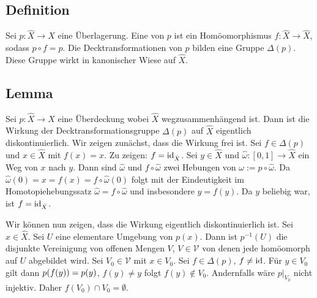 \subsection[Definition: Decktransformation]{Definition} %
\label{sub:12.6}
Sei $p : \hat{X} \to X$ eine Überlagerung. Eine  von $p$ ist ein Homöomorphismus $f : \hat{X} \to \hat{X}$, sodass $p \circ f = p$. Die 
Decktransformationen von $p$ bilden eine Gruppe $\Delta(p)$. Diese Gruppe wirkt in kanonischer Wiese auf $\hat{X}$.

\subsection{Lemma} %
\label{sub:12.7}
Sei $p : \hat{X} \to X$ eine Überdeckung wobei $\hat{X}$ wegzusammenhängend ist. Dann ist die Wirkung der Decktransformationsgruppe $\Delta(p)$ auf $\hat{X}$ eigentlich
diskontinuierlich.
Wir zeigen zunächst, dass die Wirkung frei ist. Sei $f \in \Delta(p)$ und $x \in \hat{X}$ mit $f(x) = x$. Zu zeigen: $f =\operatorname{id}_{\hat{X}}$.
Sei $y \in \hat{X}$ und $\hat{\omega} : [0,1] \to \hat{X}$ ein
Weg von $x$ nach $y$. Dann sind $\hat{\omega}$ und $f \circ \hat{\omega}$ zwei Hebungen von $\omega := p \circ \hat{\omega}$. Da 
$\hat{\omega}(0) = x = f(x) = f \circ \hat{\omega}(0)$ folgt mit der Eindeutigkeit im Homotopiehebungssatz $\hat{\omega} = f \circ \hat{\omega}$ und insbesondere $y=f(y)$.
Da $y$ beliebig war, ist $f= \operatorname{id}_{\hat{X}}$.

Wir können nun zeigen, dass die Wirkung eigentlich diskontinuierlich ist. Sei $x \in \hat{X}$. Sei $U$ eine elementare Umgebung von $p(x)$. Dann ist $p ^{-1}(U)$ die 
disjunkte Vereinigung von offenen Mengen $V$, $V \in \mathcal{V}$ von denen jede homöomorph auf $U$ abgebildet wird. Sei $V_0 \in \mathcal{V}$ mit $x \in V_0$. Sei 
$f \in \Delta(p)$, $f \not= \operatorname{id}$. Für $y \in V_0$ gilt dann $p \enbrace*{f(y)} = p(y) $, $f(y) \not=y$ folgt $f(y) \not\in V_0$. Andernfalls wäre $p\big|_{V_0}$ nicht
injektiv. Daher $f(V_0) \cap V_0 = \emptyset$. \bewende

